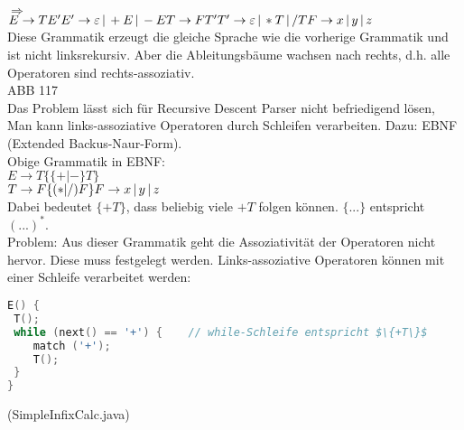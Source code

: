 $\Rightarrow$\\
$E \to T E'\\
E' \to \varepsilon \,|\, + E \,|\, -E\\
T \to FT'\\
T' \to \varepsilon \,|\, *T \,|\, /T\\
F \to x\,|\,y\,|\,z$\\
Diese Grammatik erzeugt die gleiche Sprache wie die vorherige Grammatik und ist nicht linksrekursiv. Aber die Ableitungsbäume wachsen nach rechts, d.h. alle Operatoren sind rechts-assoziativ.\\
ABB 117\\
Das Problem lässt sich für Recursive Descent Parser nicht befriedigend lösen, Man kann links-assoziative Operatoren durch Schleifen verarbeiten. Dazu: EBNF (Extended Backus-Naur-Form).\\
Obige Grammatik in EBNF:\\
$E\to T \{ \{+|-\} T \}$\\
$T \to F \{ (*|/)F\}\\
F \to x\,|\,y\,|\,z$\\
Dabei bedeutet $\{ +T \}$, dass beliebig viele $+T$ folgen können. $\{...\}$ entspricht $(...)^*$.\\
Problem: Aus dieser Grammatik geht die Assoziativität der Operatoren nicht hervor. Diese muss festgelegt werden. Links-assoziative Operatoren können mit einer Schleife verarbeitet werden:
\begin{lstlisting}[language=C]
E() {
 T();
 while (next() == '+') {	// while-Schleife entspricht $\{+T\}$
 	match ('+');
 	T();
 }
}
\end{lstlisting}
(SimpleInfixCalc.java)


